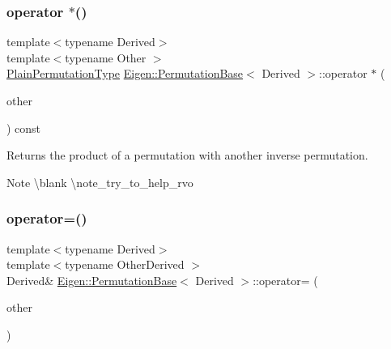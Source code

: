 \subsubsection{\texorpdfstring{operator $\ast$()}{operator *()}\hspace{0.1cm}{\footnotesize\ttfamily [2/2]}}
{\footnotesize\ttfamily template$<$typename Derived$>$ \\
template$<$typename Other $>$ \\
\mbox{\hyperlink{class_eigen_1_1_permutation_matrix}{Plain\+Permutation\+Type}} \mbox{\hyperlink{class_eigen_1_1_permutation_base}{Eigen\+::\+Permutation\+Base}}$<$ Derived $>$\+::operator $\ast$ (\begin{DoxyParamCaption}\item[{const \mbox{\hyperlink{class_eigen_1_1_inverse_impl}{Inverse\+Impl}}$<$ Other, \mbox{\hyperlink{struct_eigen_1_1_permutation_storage}{Permutation\+Storage}} $>$ \&}]{other }\end{DoxyParamCaption}) const\hspace{0.3cm}{\ttfamily [inline]}}

\begin{DoxyReturn}{Returns}
the product of a permutation with another inverse permutation.
\end{DoxyReturn}
\begin{DoxyNote}{Note}
\textbackslash{}blank \textbackslash{}note\+\_\+try\+\_\+to\+\_\+help\+\_\+rvo 
\end{DoxyNote}
\mbox{\label{class_eigen_1_1_permutation_base_a8e15540549c5a4e2d5b3b426fef8fbcf}} 
\subsubsection{\texorpdfstring{operator=()}{operator=()}\hspace{0.1cm}{\footnotesize\ttfamily [1/3]}}
{\footnotesize\ttfamily template$<$typename Derived$>$ \\
template$<$typename Other\+Derived $>$ \\
Derived\& \mbox{\hyperlink{class_eigen_1_1_permutation_base}{Eigen\+::\+Permutation\+Base}}$<$ Derived $>$\+::operator= (\begin{DoxyParamCaption}\item[{const \mbox{\hyperlink{class_eigen_1_1_permutation_base}{Permutation\+Base}}$<$ Other\+Derived $>$ \&}]{other }\end{DoxyParamCaption})\hspace{0.3cm}{\ttfamily [inline]}}

